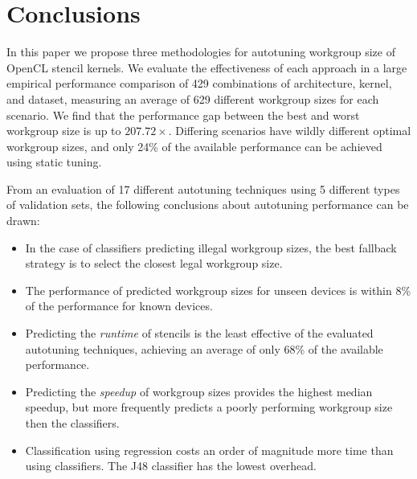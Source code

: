 \documentclass[nonatbib,preprint,10pt]{sigplanconf}
\begin{document}


\section{Conclusions}\label{sec:conclusions}

In this paper we propose three methodologies for autotuning workgroup
size of OpenCL stencil kernels. We evaluate the effectiveness of each
approach in a large empirical performance comparison of 429
combinations of architecture, kernel, and dataset, measuring an
average of 629 different workgroup sizes for each scenario. We find
that the performance gap between the best and worst workgroup size is
up to $207.72\times$. Differing scenarios have wildly different
optimal workgroup sizes, and only 24\% of the available performance
can be achieved using static tuning.

From an evaluation of 17 different autotuning techniques using 5
different types of validation sets, the following conclusions about
autotuning performance can be drawn:
%
\begin{itemize}
\item In the case of classifiers predicting illegal workgroup sizes,
  the best fallback strategy is to select the closest legal workgroup
  size.
\item The performance of predicted workgroup sizes for unseen devices
  is within 8\% of the performance for known devices.
\item Predicting the \emph{runtime} of stencils is the least effective
  of the evaluated autotuning techniques, achieving an average of only
  68\% of the available performance.
\item Predicting the \emph{speedup} of workgroup sizes provides the
  highest median speedup, but more frequently predicts a poorly
  performing workgroup size then the classifiers.
\item Classification using regression costs an order of magnitude more
  time than using classifiers. The J48 classifier has the lowest
  overhead.
\end{itemize}
\end{document}
